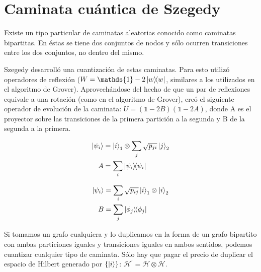 \section{Caminata cuántica de Szegedy}

Existe un tipo particular de caminatas aleatorias conocido como caminatas bipartitas. En éstas se tiene dos conjuntos de nodos y sólo ocurren transiciones entre los dos conjuntos, no dentro del mismo.


Szegedy desarrolló una cuantización de estas caminatas. Para esto utilizó operadores de reflexión ($W = \mathds{1} - 2 \ketbra{w}{w}$, similares a los utilizados en el algoritmo de Grover). Aprovechándose del hecho de que un par de reflexiones equivale a una rotación (como en el algoritmo de Grover), creó el siguiente operador de evolución de la caminata: $U = (\mathds{1} - 2 B)(\mathds{1} - 2 A)$, donde A es el proyector sobre las transiciones de la primera partición a la segunda y B de la segunda a la primera.

\begin{minipage}{0.5\linewidth}
\begin{align*}
\ket{\psi_i} &= \ket{i}_1 \otimes \sum\limits_j \sqrt{p_{j i}} \ket{j}_2 \\
A &= \sum\limits_i \ketbra{\psi_i}{\psi_i}
\end{align*}
\end{minipage}
\begin{minipage}{0.5\linewidth}
\begin{align*}
\ket{\psi_i} &= \sum\limits_i \sqrt{p_{i j}} \ket{i}_1 \otimes \ket{i}_2 \\
B &= \sum\limits_j \ketbra{\phi_j}{\phi_j}
\end{align*}
\end{minipage}

Si tomamos un grafo cualquiera y lo duplicamos en la forma de un grafo bipartito con ambas particiones iguales y transiciones iguales en ambos sentidos, podemos cuantizar cualquier tipo de caminata. Sólo hay que pagar el precio de duplicar el espacio de Hilbert generado por $\{\ket{i}\}$: $\mathcal{H}^\prime = \mathcal{H} \otimes \mathcal{H}$.

